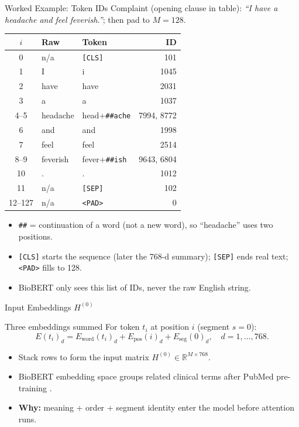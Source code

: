 \begin{frame}{Worked Example: Token IDs}
	{\scriptsize Complaint (opening clause in table): \textit{``I have a headache and feel feverish.''}; then pad to \(M=128\).}
	\vspace{0.1em}
	\begin{center}
	\scriptsize
	\begin{tabular}{|c|l|l|r|}
	\hline
	\(i\) & Raw & Token & ID \\
	\hline
	0 & n/a & \texttt{[CLS]} & 101 \\
	1 & I & i & 1045 \\
	2 & have & have & 2031 \\
	3 & a & a & 1037 \\
	4--5 & headache & head+\texttt{\#\#ache} & 7994, 8772 \\
	6 & and & and & 1998 \\
	7 & feel & feel & 2514 \\
	8--9 & feverish & fever+\texttt{\#\#ish} & 9643, 6804 \\
	10 & . & . & 1012 \\
	11 & n/a & \texttt{[SEP]} & 102 \\
	12--127 & n/a & \texttt{<PAD>} & 0 \\
	\hline
	\end{tabular}
	\end{center}
	\vspace{0.05em}
	\begin{itemize}\scriptsize
		\item \texttt{\#\#} = continuation of a word (not a new word), so ``headache'' uses two positions.
		\item \texttt{[CLS]} starts the sequence (later the 768-d summary); \texttt{[SEP]} ends real text; \texttt{<PAD>} fills to 128.
		\item BioBERT only sees this list of IDs, never the raw English string.
	\end{itemize}
\end{frame}

\begin{frame}{Input Embeddings \(H^{(0)}\)}
	\begin{block}{Three embeddings summed}
		For token \(t_i\) at position \(i\) (segment \(s=0\)):
		\[
		  E(t_i)_d = E_{\mathrm{word}}(t_i)_d + E_{\mathrm{pos}}(i)_d + E_{\mathrm{seg}}(0)_d,
		  \quad d=1,\ldots,768.
		\]
	\end{block}
	\begin{itemize}
		\item Stack rows to form the input matrix \(H^{(0)} \in \mathbb{R}^{M \times 768}\).
		\item BioBERT embedding space groups related clinical terms after PubMed pre-training \citep{lee2020biobert}.
		\item \textbf{Why:} meaning + order + segment identity enter the model before attention runs.
	\end{itemize}
\end{frame}

